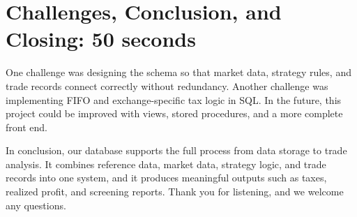 \documentclass[11pt]{article}
\begin{document}
\section*{Challenges, Conclusion, and Closing: 50 seconds}
One challenge was designing the schema so that market data, strategy rules, and trade records connect correctly without redundancy. Another challenge was implementing FIFO and exchange-specific tax logic in SQL. In the future, this project could be improved with views, stored procedures, and a more complete front end.

In conclusion, our database supports the full process from data storage to trade analysis. It combines reference data, market data, strategy logic, and trade records into one system, and it produces meaningful outputs such as taxes, realized profit, and screening reports. Thank you for listening, and we welcome any questions.
\end{document}
